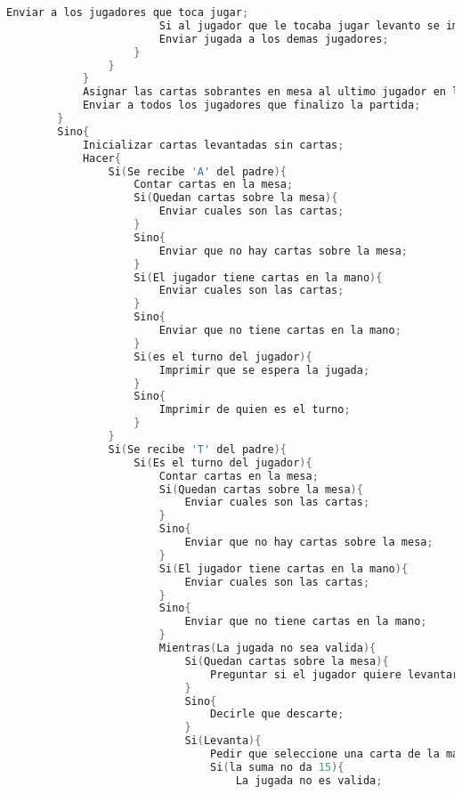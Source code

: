 \begin{lstlisting}[language=C]
                        Enviar a los jugadores que toca jugar;
                        Si al jugador que le tocaba jugar levanto se imprime que fue el ultimo en levantar;
                        Enviar jugada a los demas jugadores;
                    }
                }
            }
            Asignar las cartas sobrantes en mesa al ultimo jugador en levantar;
            Enviar a todos los jugadores que finalizo la partida;
        }
        Sino{
            Inicializar cartas levantadas sin cartas;
            Hacer{
                Si(Se recibe 'A' del padre){
                    Contar cartas en la mesa;
                    Si(Quedan cartas sobre la mesa){
                        Enviar cuales son las cartas;
                    }
                    Sino{
                        Enviar que no hay cartas sobre la mesa;
                    }
                    Si(El jugador tiene cartas en la mano){
                        Enviar cuales son las cartas;
                    }
                    Sino{
                        Enviar que no tiene cartas en la mano;
                    }
                    Si(es el turno del jugador){
                        Imprimir que se espera la jugada;
                    }
                    Sino{
                        Imprimir de quien es el turno;
                    }
                }
                Si(Se recibe 'T' del padre){
                    Si(Es el turno del jugador){
                        Contar cartas en la mesa;
                        Si(Quedan cartas sobre la mesa){
                            Enviar cuales son las cartas;
                        }
                        Sino{
                            Enviar que no hay cartas sobre la mesa;
                        }
                        Si(El jugador tiene cartas en la mano){
                            Enviar cuales son las cartas;
                        }
                        Sino{
                            Enviar que no tiene cartas en la mano;
                        }
                        Mientras(La jugada no sea valida){
                            Si(Quedan cartas sobre la mesa){
                                Preguntar si el jugador quiere levantar o descartar;
                            }
                            Sino{
                                Decirle que descarte;
                            }
                            Si(Levanta){
                                Pedir que seleccione una carta de la mano y las correspondientes de la mesa;
                                Si(la suma no da 15){
                                    La jugada no es valida;

\end{lstlisting}
